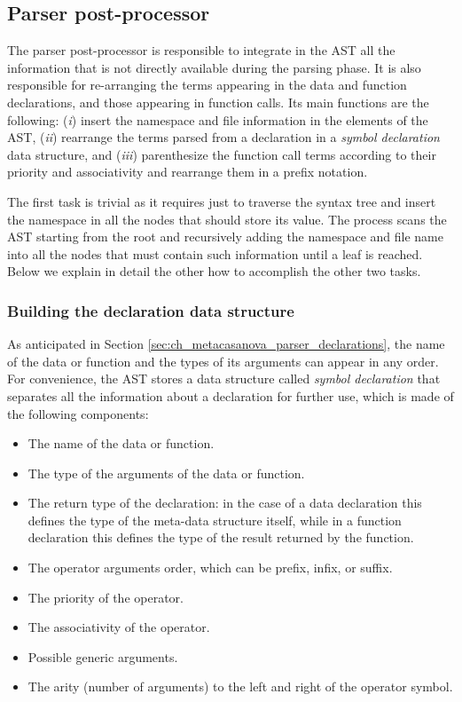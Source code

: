 \subsection{Parser post-processor}
\label{sec:ch_metacasanova_parser_post-processor}
The parser post-processor is responsible to integrate in the AST all the information that is not directly available during the parsing phase. It is also responsible for re-arranging the terms appearing in the data and function declarations, and those appearing in function calls. Its main functions are the following: (\textit{i}) insert the namespace and file information in the elements of the AST, (\textit{ii}) rearrange the terms parsed from a declaration in a \textit{symbol declaration} data structure, and (\textit{iii}) parenthesize the function call terms according to their priority and associativity and rearrange them in a prefix notation.

The first task is trivial as it requires just to traverse the syntax tree and insert the namespace in all the nodes that should store its value. The process scans the AST starting from the root and recursively adding the namespace and file name into all the nodes that must contain such information until a leaf is reached. Below we explain in detail the other how to accomplish the other two tasks.

\subsubsection{Building the declaration data structure}
As anticipated in Section \ref{sec:ch_metacasanova_parser_declarations}, the name of the data or function and the types of its arguments can appear in any order. For convenience, the AST stores a data structure called \textit{symbol declaration} that separates all the information about a declaration for further use, which is made of the following components:

\begin{itemize}[noitemsep]
	\item The name of the data or function.
	\item The type of the arguments of the data or function.
	\item The return type of the declaration: in the case of a data declaration this defines the type of the meta-data structure itself, while in a function declaration this defines the type of the result returned by the function.
	\item The operator arguments order, which can be prefix, infix, or suffix.
	\item The priority of the operator.
	\item The associativity of the operator.
	\item Possible generic arguments.
	\item The arity (number of arguments) to the left and right of the operator symbol.
\end{itemize}

